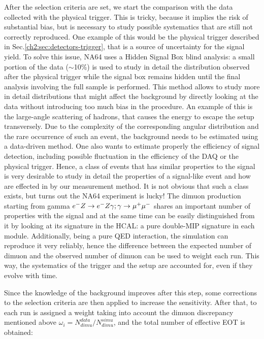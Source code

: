 After the selection criteria are set, we start the comparison with the data collected with the physical trigger. This is tricky, because it implies the risk of substantial bias, but is necessary to study possible systematics that are still not correctly reproduced. One example of this would be the physical trigger described in Sec.\ref{ch2:sec:detectors-trigger}, that is a source of uncertainty for the signal yield. To solve this issue, NA64 uses a Hidden Signal Box blind analysis\cite{blind-analysis}: a small portion of the data ($\sim$10\%) is used to study in detail the distribution observed after the physical trigger while the signal box remains hidden until the final analysis involving the full sample is performed. This method allows to study more in detail distributions that might affect the background by directly looking at the data without introducing too much bias in the procedure. An example of this is the large-angle scattering of hadrons, that causes the energy to escape the setup transversely. Due to the complexity of the corresponding angular distribution and the rare occurrence of such an event, the background needs to be estimated using a data-driven method. One also wants to estimate properly the efficiency of signal detection, including possible fluctuation in the efficiency of the DAQ or the physical trigger. Hence, a class of events that has similar properties to the signal is very desirable to study in detail the properties of a signal-like event and how are effected in by our measurement method. It is not obvious that such a class exists, but turns out the NA64 experiment is lucky! The dimuon production starting from gamma $e^- Z \to e^- Z \gamma; \gamma \to \mu^+ \mu^-$ shares an important number of properties with the signal and at the same time can be easily distinguished from it by looking at its signature in the HCAL: a pure double-MIP signature in each module. Additionally, being a pure QED interaction, the simulation can reproduce it very reliably, hence the difference between the expected number of dimuon and the observed number of dimuon can be used to weight each run. This way, the systematics of the trigger and the setup are accounted for, even if they evolve with time.

Since the knowledge of the background improves after this step, some corrections to the selection criteria are then applied to increase the sensitivity. After that, to each run is assigned a weight taking into account the dimuon discrepancy mentioned above $\omega_i = N^{data}_{dimu}/N^{simu}_{dimu}$, and the total number of effective EOT is obtained:

